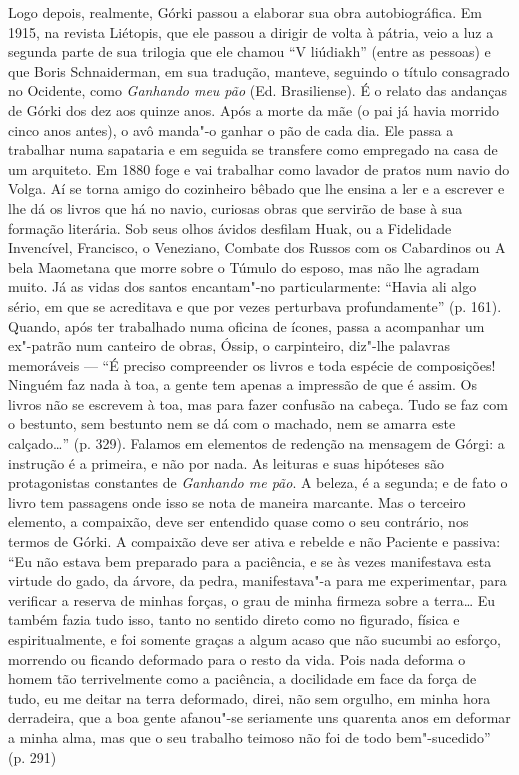 Logo depois, realmente, Górki passou a elaborar sua obra autobiográfica.
Em 1915, na revista Liétopis, que ele passou a dirigir de volta à
pátria, veio a luz a segunda parte de sua trilogia que ele chamou ``V
liúdiakh'' (entre as pessoas) e que Boris Schnaiderman, em sua tradução,
manteve, seguindo o título consagrado no Ocidente, como \emph{Ganhando
meu pão} (Ed. Brasiliense). É o relato das andanças de Górki dos dez aos
quinze anos. Após a morte da mãe (o pai já havia morrido cinco anos
antes), o avô manda"-o ganhar o pão de cada dia. Ele passa a trabalhar
numa sapataria e em seguida se transfere como empregado na casa de um
arquiteto. Em 1880 foge e vai trabalhar como lavador de pratos num navio
do Volga. Aí se torna amigo do cozinheiro bêbado que lhe ensina a ler e
a escrever e lhe dá os livros que há no navio, curiosas obras que
servirão de base à sua formação literária. Sob seus olhos ávidos
desfilam Huak, ou a Fidelidade Invencível, Francisco, o Veneziano,
Combate dos Russos com os Cabardinos ou A bela Maometana que morre sobre
o Túmulo do esposo, mas não lhe agradam muito. Já as vidas dos santos
encantam"-no particularmente: ``Havia ali algo sério, em que se
acreditava e que por vezes perturbava profundamente'' (p. 161). Quando,
após ter trabalhado numa oficina de ícones, passa a acompanhar um
ex"-patrão num canteiro de obras, Óssip, o carpinteiro, diz"-lhe palavras
memoráveis --- ``É preciso compreender os livros e toda espécie de
composições! Ninguém faz nada à toa, a gente tem apenas a impressão de
que é assim. Os livros não se escrevem à toa, mas para fazer confusão na
cabeça. Tudo se faz com o bestunto, sem bestunto nem se dá com o
machado, nem se amarra este calçado\ldots{}'' (p. 329). Falamos em elementos
de redenção na mensagem de Górgi: a instrução é a primeira, e não por
nada. As leituras e suas hipóteses são protagonistas constantes de
\emph{Ganhando me pão}. A beleza, é a segunda; e de fato o livro tem
passagens onde isso se nota de maneira marcante. Mas o terceiro
elemento, a compaixão, deve ser entendido quase como o seu contrário,
nos termos de Górki. A compaixão deve ser ativa e rebelde e não Paciente
e passiva: ``Eu não estava bem preparado para a paciência, e se às vezes
manifestava esta virtude do gado, da árvore, da pedra, manifestava"-a
para me experimentar, para verificar a reserva de minhas forças, o grau
de minha firmeza sobre a terra\ldots{} Eu também fazia tudo isso, tanto no
sentido direto como no figurado, física e espiritualmente, e foi somente
graças a algum acaso que não sucumbi ao esforço, morrendo ou ficando
deformado para o resto da vida. Pois nada deforma o homem tão
terrivelmente como a paciência, a docilidade em face da força de tudo,
eu me deitar na terra deformado, direi, não sem orgulho, em minha hora
derradeira, que a boa gente afanou"-se seriamente uns quarenta anos em
deformar a minha alma, mas que o seu trabalho teimoso não foi de todo
bem"-sucedido'' (p. 291)

